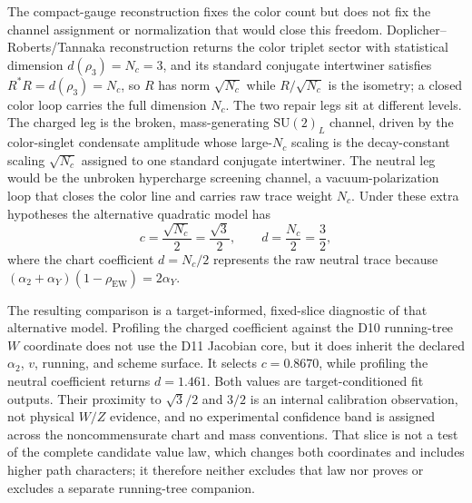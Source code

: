 \documentclass[11pt]{article}
\newcommand{\SU}{\mathrm{SU}}
\begin{document}
The compact-gauge reconstruction fixes the color count but does not fix the
channel assignment or normalization that would close this freedom.
Doplicher--Roberts/Tannaka reconstruction returns the color triplet sector with statistical
dimension \(d(\rho_3)=N_c=3\), and its standard conjugate intertwiner satisfies
\(R^*R=d(\rho_3)=N_c\), so \(R\) has norm \(\sqrt{N_c}\) while
\(R/\sqrt{N_c}\) is the isometry; a closed color loop carries the full
dimension \(N_c\). The two repair legs sit at different levels. The charged leg is the broken,
mass-generating \(\SU(2)_L\) channel, driven by the color-singlet condensate amplitude whose
large-\(N_c\) scaling is the decay-constant scaling \(\sqrt{N_c}\) assigned to one standard
conjugate intertwiner. The
neutral leg would be the unbroken hypercharge screening channel, a
vacuum-polarization loop that closes the color line and carries raw trace
weight \(N_c\).  Under these extra hypotheses the alternative quadratic model
has
\[
c=\frac{\sqrt{N_c}}{2}=\frac{\sqrt3}{2},
\qquad
d=\frac{N_c}{2}=\frac32,
\]
where the chart coefficient \(d=N_c/2\) represents the raw neutral trace
because
\((\alpha_2+\alpha_Y)(1-\rho_{\mathrm{EW}})=2\alpha_Y\).

The resulting comparison is a target-informed, fixed-slice diagnostic of that
alternative model. Profiling the charged coefficient against
the D10 running-tree \(W\) coordinate does not use the D11 Jacobian core, but
it does inherit the declared \(\alpha_2\), \(v\), running, and scheme surface. It selects
\(c=0.8670\), while profiling the neutral coefficient returns \(d=1.461\). Both values are
target-conditioned fit outputs. Their proximity to \(\sqrt3/2\) and \(3/2\) is an internal
calibration observation, not physical \(W/Z\) evidence, and no experimental confidence band is
assigned across the noncommensurate chart and mass conventions. That slice is not a test of the complete candidate
value law, which changes both coordinates and includes higher path characters;
it therefore neither excludes that law nor proves or excludes a separate
running-tree companion.
\end{document}

